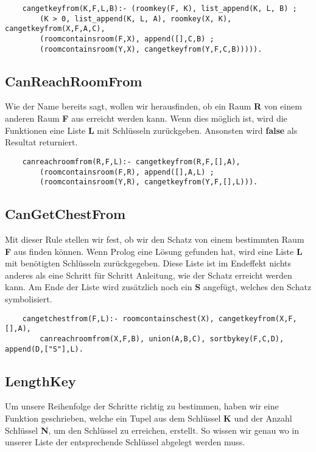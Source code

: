 \begin{verbatim}
    cangetkeyfrom(K,F,L,B):- (roomkey(F, K), list_append(K, L, B) ; 
        (K > 0, list_append(K, L, A), roomkey(X, K), cangetkeyfrom(X,F,A,C), 
        (roomcontainsroom(F,X), append([],C,B) ; 
        (roomcontainsroom(Y,X), cangetkeyfrom(Y,F,C,B))))).
\end{verbatim}

\subsection{CanReachRoomFrom}
Wie der Name bereits sagt, wollen wir herausfinden, ob ein Raum \textbf{R} von einem
anderen Raum \textbf{F} aus erreicht werden kann. Wenn dies möglich ist, wird die Funktionen
eine Liste \textbf{L} mit Schlüsseln zurückgeben. Ansonsten wird \textbf{false} als Resultat returniert.

\begin{verbatim}
    canreachroomfrom(R,F,L):- cangetkeyfrom(R,F,[],A), 
        (roomcontainsroom(F,R), append([],A,L) ; 
        (roomcontainsroom(Y,R), cangetkeyfrom(Y,F,[],L))).
\end{verbatim}

\subsection{CanGetChestFrom}
Mit dieser Rule stellen wir fest, ob wir den Schatz von einem bestimmten
Raum \textbf{F} aus finden können. Wenn Prolog eine Lösung gefunden hat, wird eine
Liste \textbf{L} mit benötigten Schlüsseln zurückgegeben. Diese Liste ist im Endeffekt
nichts anderes als eine Schritt für Schritt Anleitung, wie der Schatz erreicht werden 
kann. Am Ende der Liste wird zusätzlich noch ein \textbf{S} angefügt, welches den Schatz 
symbolisiert.

\begin{verbatim}
    cangetchestfrom(F,L):- roomcontainschest(X), cangetkeyfrom(X,F,[],A),
        canreachroomfrom(X,F,B), union(A,B,C), sortbykey(F,C,D), append(D,["S"],L).
\end{verbatim}

\newpage

\subsection{LengthKey}
Um unsere Reihenfolge der Schritte richtig zu bestimmen, haben wir eine Funktion geschrieben,
welche ein Tupel aus dem Schlüssel \textbf{K} und der Anzahl Schlüssel \textbf{N}, um den Schlüssel
zu erreichen, erstellt. So wissen wir genau wo in unserer Liste der entsprechende Schlüssel
abgelegt werden muss.

